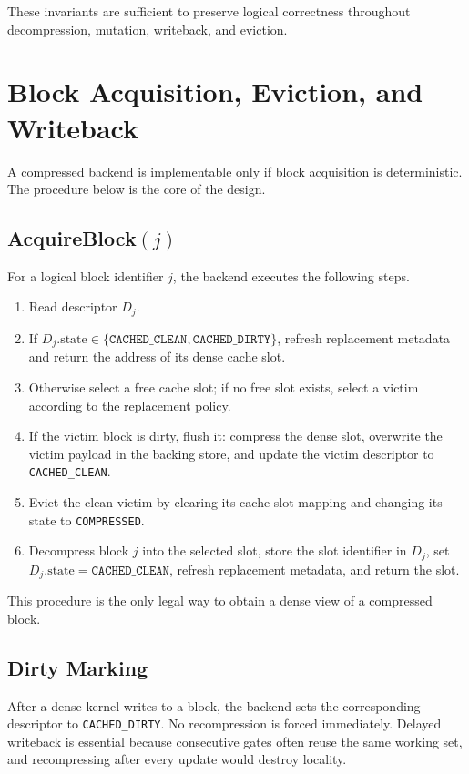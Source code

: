 \documentclass[runningheads]{llncs}
\begin{document}
These invariants are sufficient to preserve logical correctness throughout decompression, mutation, writeback, and eviction.

\section{Block Acquisition, Eviction, and Writeback}

A compressed backend is implementable only if block acquisition is deterministic. The procedure below is the core of the design.

\subsection{AcquireBlock$(j)$}

For a logical block identifier $j$, the backend executes the following steps.
\begin{enumerate}[leftmargin=1.5em]
  \item Read descriptor $D_j$.
  \item If $D_j.\mathrm{state}\in\{\texttt{CACHED\_CLEAN},\texttt{CACHED\_DIRTY}\}$, refresh replacement metadata and return the address of its dense cache slot.
  \item Otherwise select a free cache slot; if no free slot exists, select a victim according to the replacement policy.
  \item If the victim block is dirty, flush it: compress the dense slot, overwrite the victim payload in the backing store, and update the victim descriptor to \texttt{CACHED\_CLEAN}.
  \item Evict the clean victim by clearing its cache-slot mapping and changing its state to \texttt{COMPRESSED}.
  \item Decompress block $j$ into the selected slot, store the slot identifier in $D_j$, set $D_j.\mathrm{state}=\texttt{CACHED\_CLEAN}$, refresh replacement metadata, and return the slot.
\end{enumerate}

This procedure is the only legal way to obtain a dense view of a compressed block.

\subsection{Dirty Marking}

After a dense kernel writes to a block, the backend sets the corresponding descriptor to \texttt{CACHED\_DIRTY}. No recompression is forced immediately. Delayed writeback is essential because consecutive gates often reuse the same working set, and recompressing after every update would destroy locality.
\end{document}
